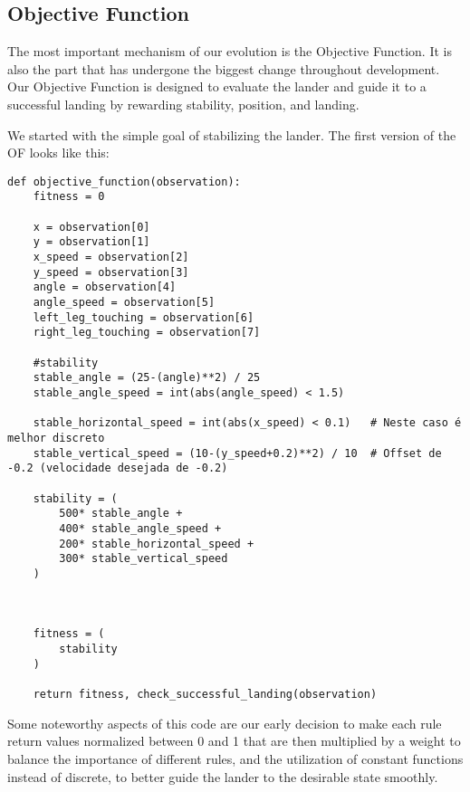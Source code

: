 \documentclass{article}
\begin{document}
\subsection{Objective Function}
The most important mechanism of our evolution is the Objective Function. It is also the part that has undergone the biggest change throughout development.
Our Objective Function is designed to evaluate the lander and guide it to a successful landing by rewarding stability, position, and landing.

We started with the simple goal of stabilizing the lander. The first version of the OF looks like this:
\begin{lstlisting}
def objective_function(observation):
    fitness = 0

    x = observation[0]
    y = observation[1]
    x_speed = observation[2]
    y_speed = observation[3]
    angle = observation[4]
    angle_speed = observation[5]
    left_leg_touching = observation[6]
    right_leg_touching = observation[7]

    #stability
    stable_angle = (25-(angle)**2) / 25
    stable_angle_speed = int(abs(angle_speed) < 1.5)

    stable_horizontal_speed = int(abs(x_speed) < 0.1)   # Neste caso é melhor discreto
    stable_vertical_speed = (10-(y_speed+0.2)**2) / 10  # Offset de -0.2 (velocidade desejada de -0.2)

    stability = (
        500* stable_angle +
        400* stable_angle_speed +
        200* stable_horizontal_speed +
        300* stable_vertical_speed
    )



    fitness = (
        stability
    )

    return fitness, check_successful_landing(observation)
\end{lstlisting}

Some noteworthy aspects of this code are our early decision to make each rule return values normalized between 0 and 1 that are then multiplied by a weight to balance the importance of different rules, and the utilization of constant functions instead of discrete, to better guide the lander to the desirable state smoothly.
\end{document}
